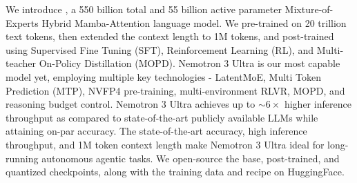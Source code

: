 \normalsize




We introduce \ourmodel, a 550 billion total and 55 billion active parameter Mixture-of-Experts Hybrid Mamba-Attention language model. We pre-trained \ourmodel on 20 trillion text tokens, then extended the context length to 1M tokens, and post-trained using Supervised Fine Tuning (SFT), Reinforcement Learning (RL), and Multi-teacher On-Policy Distillation (MOPD). Nemotron 3 Ultra is our most capable model yet, employing multiple key technologies - LatentMoE, Multi Token Prediction (MTP), NVFP4 pre-training, multi-environment RLVR, MOPD, and reasoning budget control. Nemotron 3 Ultra achieves up to $\sim6\times$ higher inference throughput as compared to state-of-the-art publicly available LLMs while attaining on-par accuracy. The state-of-the-art accuracy, high inference throughput, and 1M token context length make Nemotron 3 Ultra ideal for long-running autonomous agentic tasks. We open-source the base, post-trained, and quantized checkpoints, along with the training data and recipe on HuggingFace.


